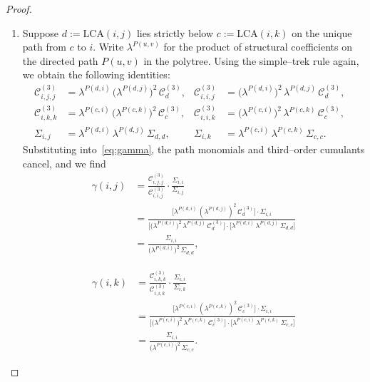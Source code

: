 \documentclass[11pt,a4paper]{article}
\numberwithin{equation}{section}
\begin{document}
\begin{proof}
\begin{enumerate}[label=(\arabic*)]
  \item Suppose $d:=\mathrm{LCA}(i,j)$ lies strictly below $c:=\mathrm{LCA}(i,k)$ on the unique path from \(c\) to \(i\).  Write \(\lambda^{P(u,v)}\) for the product of structural coefficients on the directed path \(P(u,v)\) in the polytree.  Using the simple–trek rule again, we obtain the following identities:
  \[
    \begin{aligned}
    \mathcal{C}^{(3)}_{i,j,j}&=\lambda^{P(d,i)}\,\bigl(\lambda^{P(d,j)}\bigr)^{2}\,\mathcal{C}^{(3)}_{d},&
    \mathcal{C}^{(3)}_{i,i,j}&=\bigl(\lambda^{P(d,i)}\bigr)^{2}\,\lambda^{P(d,j)}\,\mathcal{C}^{(3)}_{d},\\[0.5ex]
    \mathcal{C}^{(3)}_{i,k,k}&=\lambda^{P(c,i)}\,\bigl(\lambda^{P(c,k)}\bigr)^{2}\,\mathcal{C}^{(3)}_{c},&
    \mathcal{C}^{(3)}_{i,i,k}&=\bigl(\lambda^{P(c,i)}\bigr)^{2}\,\lambda^{P(c,k)}\,\mathcal{C}^{(3)}_{c},\\[0.5ex]
    \Sigma_{i,j}&=\lambda^{P(d,i)}\,\lambda^{P(d,j)}\,\Sigma_{d,d},&
    \Sigma_{i,k}&=\lambda^{P(c,i)}\,\lambda^{P(c,k)}\,\Sigma_{c,c}.&
    \end{aligned}
  \]
  Substituting into~\eqref{eq:gamma}, the path monomials and third–order cumulants cancel, and we find
  \begin{align*}
      \gamma(i,j)
      &= \frac{\mathcal{C}^{(3)}_{i,j,j}}{\mathcal{C}^{(3)}_{i,i,j}}
         \cdot\frac{\Sigma_{i,i}}{\Sigma_{i,j}}  \\[1ex]
      &=
      \frac{
        \bigl[\lambda^{P(d,i)}\,(\lambda^{P(d,j)})^2\,\mathcal{C}^{(3)}_{d}\bigr]
        \cdot
        \Sigma_{i,i}
      }{
        \bigl[\bigl(\lambda^{P(d,i)}\bigr)^2\,\lambda^{P(d,j)}\,\mathcal{C}^{(3)}_{d}\bigr]
        \cdot
        \bigl[\lambda^{P(d,i)}\,\lambda^{P(d,j)}\,\Sigma_{d,d}\bigr]
      } \\[1ex]
      &= \frac{\Sigma_{i,i}}{\bigl(\lambda^{P(d,i)}\bigr)^{2}\,\Sigma_{d,d}},
    \end{align*}
    
  \begin{align*}
      \gamma(i,k)
      &= \frac{\mathcal{C}^{(3)}_{i,k,k}}{\mathcal{C}^{(3)}_{i,i,k}}
         \cdot\frac{\Sigma_{i,i}}{\Sigma_{i,k}}  \\[1ex]
      &=
      \frac{
        \bigl[\lambda^{P(c,i)}\,(\lambda^{P(c,k)})^2\,\mathcal{C}^{(3)}_{c}\bigr]
        \cdot
        \Sigma_{i,i}
      }{
        \bigl[\bigl(\lambda^{P(c,i)}\bigr)^2\,\lambda^{P(c,k)}\,\mathcal{C}^{(3)}_{c}\bigr]
        \cdot
        \bigl[\lambda^{P(c,i)}\,\lambda^{P(c,k)}\,\Sigma_{c,c}\bigr]
      } \\[1ex]
      &= \frac{\Sigma_{i,i}}{\bigl(\lambda^{P(c,i)}\bigr)^{2}\,\Sigma_{c,c}}.
    \end{align*}


\end{enumerate}
\end{proof}
\end{document}
